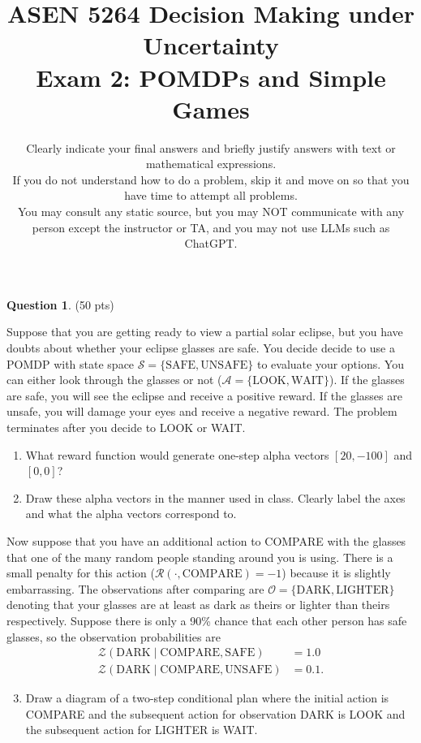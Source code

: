 \documentclass{article}
\title{ASEN 5264 Decision Making under Uncertainty\\
       Exam 2: POMDPs and Simple Games}
\date{\small Clearly indicate your final answers and briefly justify answers with text or mathematical expressions.\\
If you do not understand how to do a problem, skip it and move on so that you have time to attempt all problems.\\
You may consult any static source, but you may NOT communicate with any person except the instructor or TA, and you may not use LLMs such as ChatGPT.}
\theoremstyle{definition}
\newtheorem{question}[thm]{Question}
\begin{document}
\maketitle

\begin{question} \label{q:eclipse} (50 pts)

    Suppose that you are getting ready to view a partial solar eclipse, but you have doubts about whether your eclipse glasses are safe. You decide decide to use a POMDP with state space $\mathcal{S} = \{\text{SAFE}, \text{UNSAFE}\}$ to evaluate your options. You can either look through the glasses or not ($\mathcal{A} = \{\text{LOOK}, \text{WAIT}\}$). If the glasses are safe, you will see the eclipse and receive a positive reward. If the glasses are unsafe, you will damage your eyes and receive a negative reward. The problem terminates after you decide to LOOK or WAIT.
    \begin{enumerate}[label=\alph*)]
        \item What reward function would generate one-step alpha vectors $[20, -100]$ and $[0, 0]$?
        \item Draw these alpha vectors in the manner used in class. Clearly label the axes and what the alpha vectors correspond to. \label{item:alpha}
    \end{enumerate}
    Now suppose that you have an additional action to COMPARE with the glasses that one of the many random people standing around you is using. There is a small penalty for this action ($\mathcal{R}(\cdot, \text{COMPARE}) = -1$) because it is slightly embarrassing. The observations after comparing are $\mathcal{O} = \{\text{DARK}, \text{LIGHTER}\}$ denoting that your glasses are at least as dark as theirs or lighter than theirs respectively. Suppose there is only a 90\% chance that each other person has safe glasses, so the observation probabilities are
    \begin{align*}
        \mathcal{Z}(\text{DARK} \mid \text{COMPARE}, \text{SAFE}) &= 1.0 \\
        \mathcal{Z}(\text{DARK} \mid \text{COMPARE}, \text{UNSAFE}) &= 0.1 \text{.}
    \end{align*}
    \begin{enumerate}[label=\alph*)]
        \setcounter{enumi}{2}
        \item Draw a diagram of a two-step conditional plan where the initial action is COMPARE and the subsequent action for observation DARK is LOOK and the subsequent action for LIGHTER is WAIT.

\end{enumerate}
\end{question}
\end{document}
